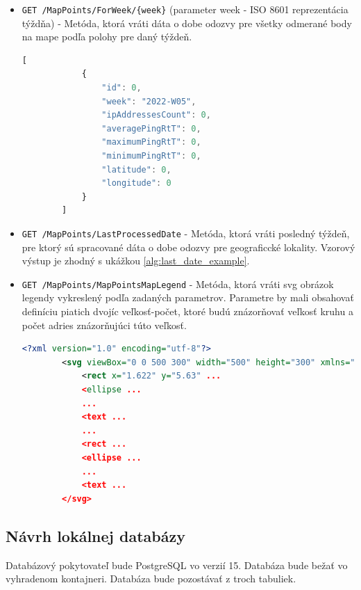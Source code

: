 \begin{itemize}
\begin{lstlisting}[language={TypeScript},caption={Vzorový výstup z endpointu},label=alg:last_date_example]
        }
    \end{lstlisting}
    \item \verb|GET /MapPoints/ForWeek/{week}| (parameter week - ISO 8601 reprezentácia týždňa) - Metóda, ktorá vráti dáta o dobe odozvy pre všetky odmerané body na mape podľa polohy pre daný týždeň. 
    \begin{lstlisting}[language={TypeScript},caption={Vzorový výstup z endpointu},label=alg:get_map_points_info_example]
        [
            {
                "id": 0,
                "week": "2022-W05",
                "ipAddressesCount": 0,
                "averagePingRtT": 0,
                "maximumPingRtT": 0,
                "minimumPingRtT": 0,
                "latitude": 0,
                "longitude": 0
            }
        ]
    \end{lstlisting}
    \item \verb|GET /MapPoints/LastProcessedDate| - Metóda, ktorá vráti posledný týždeň, pre ktorý sú spracované dáta o dobe odozvy pre geograficcké lokality.
    Vzorový výstup je zhodný s ukážkou \ref{alg:last_date_example}.
    \item \verb|GET /MapPoints/MapPointsMapLegend| - Metóda, ktorá vráti svg obrázok legendy vykreslený podľa zadaných parametrov. Parametre by mali obsahovať 
    definíciu piatich dvojíc veľkosť-počet, ktoré budú znázorňovať veľkosť kruhu a počet adries znázorňujúci túto veľkosť.
    \begin{lstlisting}[language={XML},caption={Vzorový výstup z endpointu},label=alg:legend_example]
        <?xml version="1.0" encoding="utf-8"?>
        <svg viewBox="0 0 500 300" width="500" height="300" xmlns="http://www.w3.org/2000/svg">
            <rect x="1.622" y="5.63" ...
            <ellipse ...
            ...
            <text ...
            ...
            <rect ...
            <ellipse ...
            ...
            <text ...
        </svg>
    \end{lstlisting}
\end{itemize}

\subsection{Návrh lokálnej databázy}
Databázový pokytovateľ bude PostgreSQL vo verzií 15. Databáza bude bežať vo vyhradenom kontajneri. Databáza bude pozostávať z troch tabuliek. 
    
